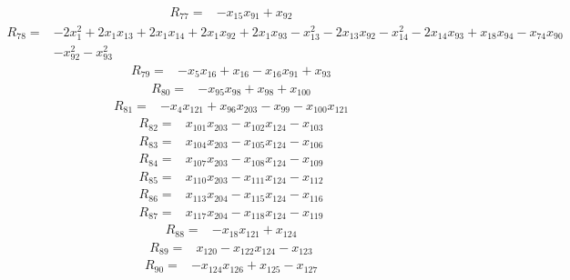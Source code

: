 \begin{align*}
R_{77}={}&-x_{15}x_{91}+x_{92}
\end{align*}
\begin{align*}
R_{78}={}&-2x_{1}^{2}+2x_{1}x_{13}+2x_{1}x_{14}+2x_{1}x_{92}+2x_{1}x_{93}-x_{13}^{2}-2x_{13}x_{92}-x_{14}^{2}-2x_{14}x_{93}+x_{18}x_{94}-x_{74}x_{90}\\
{}&-x_{92}^{2}-x_{93}^{2}
\end{align*}
\begin{align*}
R_{79}={}&-x_{5}x_{16}+x_{16}-x_{16}x_{91}+x_{93}
\end{align*}
\begin{align*}
R_{80}={}&-x_{95}x_{98}+x_{98}+x_{100}
\end{align*}
\begin{align*}
R_{81}={}&-x_{4}x_{121}+x_{96}x_{203}-x_{99}-x_{100}x_{121}
\end{align*}
\begin{align*}
R_{82}={}&x_{101}x_{203}-x_{102}x_{124}-x_{103}
\end{align*}
\begin{align*}
R_{83}={}&x_{104}x_{203}-x_{105}x_{124}-x_{106}
\end{align*}
\begin{align*}
R_{84}={}&x_{107}x_{203}-x_{108}x_{124}-x_{109}
\end{align*}
\begin{align*}
R_{85}={}&x_{110}x_{203}-x_{111}x_{124}-x_{112}
\end{align*}
\begin{align*}
R_{86}={}&x_{113}x_{204}-x_{115}x_{124}-x_{116}
\end{align*}
\begin{align*}
R_{87}={}&x_{117}x_{204}-x_{118}x_{124}-x_{119}
\end{align*}
\begin{align*}
R_{88}={}&-x_{18}x_{121}+x_{124}
\end{align*}
\begin{align*}
R_{89}={}&x_{120}-x_{122}x_{124}-x_{123}
\end{align*}
\begin{align*}
R_{90}={}&-x_{124}x_{126}+x_{125}-x_{127}
\end{align*}
